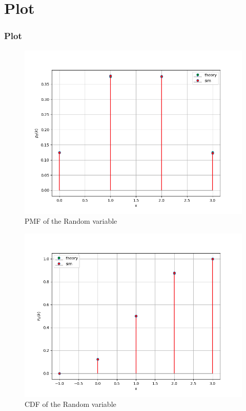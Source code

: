 \documentclass{beamer}
\theoremstyle{remark}
\numberwithin{equation}{section}
\begin{document}
\section{Plot}
\begin{frame}
\frametitle{Plot}
\begin{figure}[h!]
   \centering
   \includegraphics[width=0.8\columnwidth]{figs/pmf.png}
   \caption{PMF of the Random variable}
   \label{stemplot}
\end{figure}
\end{frame}
\begin{frame}
\begin{figure}[h!]
   \centering
   \includegraphics[width=0.8\columnwidth]{figs/cdf.png}
   \caption{CDF of the Random variable}
   \label{stemplot}
\end{figure}
\end{frame}
\end{document}
